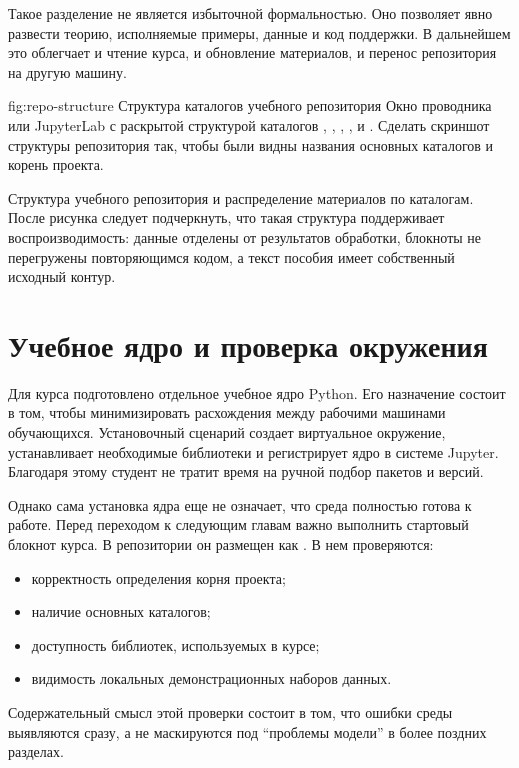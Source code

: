 Такое разделение не является избыточной формальностью. Оно позволяет явно развести теорию, исполняемые примеры, данные и код поддержки. В дальнейшем это облегчает и чтение курса, и обновление материалов, и перенос репозитория на другую машину.

\screenshotplaceholder
  {fig:repo-structure}
  {Структура каталогов учебного репозитория}
  {Окно проводника или JupyterLab с раскрытой структурой каталогов , , , ,  и .}
  {Сделать скриншот структуры репозитория так, чтобы были видны названия основных каталогов и корень проекта.}

\figureinstruction
  {Структура учебного репозитория и распределение материалов по каталогам.}
  {После рисунка следует подчеркнуть, что такая структура поддерживает воспроизводимость: данные отделены от результатов обработки, блокноты не перегружены повторяющимся кодом, а текст пособия имеет собственный исходный контур.}

\section{Учебное ядро и проверка окружения}

Для курса подготовлено отдельное учебное ядро Python. Его назначение состоит в том, чтобы минимизировать расхождения между рабочими машинами обучающихся. Установочный сценарий создает виртуальное окружение, устанавливает необходимые библиотеки и регистрирует ядро в системе Jupyter. Благодаря этому студент не тратит время на ручной подбор пакетов и версий.

Однако сама установка ядра еще не означает, что среда полностью готова к работе. Перед переходом к следующим главам важно выполнить стартовый блокнот курса. В репозитории он размещен как . В нем проверяются:
\begin{itemize}[leftmargin=1.25cm]
\item корректность определения корня проекта;
\item наличие основных каталогов;
\item доступность библиотек, используемых в курсе;
\item видимость локальных демонстрационных наборов данных.
\end{itemize}

Содержательный смысл этой проверки состоит в том, что ошибки среды выявляются сразу, а не маскируются под ``проблемы модели'' в более поздних разделах.


